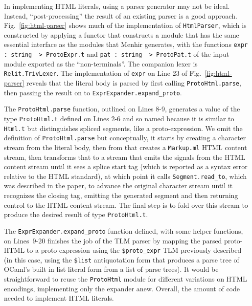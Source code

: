 \documentclass[12pt]{report}
\newcommand{\li}[1]{\lstinline[basicstyle=\ttfamily\fontsize{10pt}{1em}\selectfont]{#1}}
\begin{document}
In implementing HTML literals, using a parser generator may not be ideal. Instead, ``post-processing'' the result of an existing parser is a good approach. Fig.~\ref{fig:html-parser} shows much of the implementation of \li{HtmlParser},  which is constructed by applying a functor that constructs a module that has the same essential interface as the modules that Menhir generates, with the functions \li{expr : string -> ProtoExpr.t} and \li{pat : string -> ProtoPat.t} of the input module exported as the ``non-terminals''. The companion lexer is \li{Relit.TrivLexer}. The implementation of \li{expr} on Line 23 of Fig.~\ref{fig:html-parser} reveals that the literal body is parsed by first calling \li{ProtoHtml.parse}, then passing the result on to \li{ExprExpander.expand_proto}.

The \li{ProtoHtml.parse} function, outlined on Lines 8-9, generates a value of the type \li{ProtoHtml.t} defined on Lines 2-6 and so named because it is similar to \li{Html.t} but distinguishes spliced segments, like a proto-expression. We omit the definition of \li{ProtoHtml.parse} but conceptually, it starts by creating a character stream from the literal body, then from that creates a \li{Markup.ml} HTML content stream, then transforms that to a stream that emits the signals from the HTML content stream until it sees a splice start tag (which is reported as a syntax error relative to the HTML standard), at which point it calls \li{Segment.read_to}, which was described in the paper, to advance the original character stream until it recognizes the closing tag, emitting the generated segment and then returning control to the HTML content stream. The final step is to fold over this stream to produce the desired result of type \li{ProtoHtml.t}. 

The \li{ExprExpander.expand_proto} function defined, with some helper functions, on Lines~9-20 finishes the job of the TLM parser by mapping the parsed proto-HTML to a proto-expression using the \li{$proto_expr} TLM previously described (in this case, using the \li{$list} antiquotation form that produces a parse tree of OCaml's built in list literal form from a list of parse trees). It would be straightforward to reuse the \li{ProtoHtml} module for different variations on HTML encodings, implementing only the expander anew. Overall, the amount of code needed to implement HTML literals.
\end{document}
